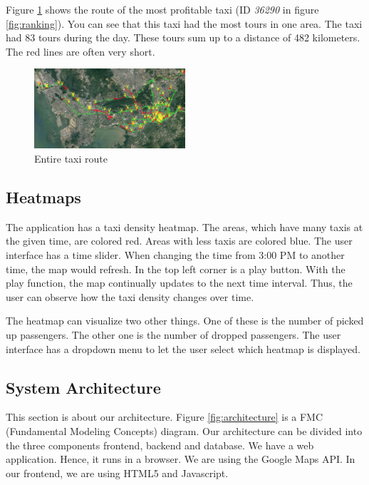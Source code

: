\documentclass[10pt]{sig-alternate}
\begin{document}
Figure \ref{fig:best_taxi} shows the route of the most profitable taxi (ID \textit{36290} in figure \ref{fig:ranking}). You can see that this taxi had the most tours in one area. The taxi had 83 tours during the day. These tours sum up to a distance of 482 kilometers. The red lines are often very short.

\begin{figure}[ht]
\centering
\includegraphics[width=0.5\textwidth]{img/best_taxi.png}
\caption{Entire taxi route}
\label{fig:best_taxi}
\end{figure}

\subsection{Heatmaps}
\label{sec:heatmaps}

The application has a taxi density heatmap. The areas, which have many taxis at the given time, are colored red. Areas with less taxis are colored blue. The user interface has a time slider. When changing the time from 3:00 PM to another time, the map would refresh. In the top left corner is a play button. With the play function, the map continually updates to the next time interval. Thus, the user can observe how the taxi density changes over time.

The heatmap can visualize two other things. One of these is the number of picked up passengers. The other one is the number of dropped passengers. The user interface has a dropdown menu to let the user select which heatmap is displayed.

\subsection{System Architecture}

This section is about our architecture. Figure \ref{fig:architecture} is a FMC (Fundamental Modeling Concepts) diagram. Our architecture can be divided into the three components frontend, backend and database. We have a web application. Hence, it runs in a browser. We are using the Google Maps API. In our frontend, we are using HTML5 and Javascript.\\
\end{document}
